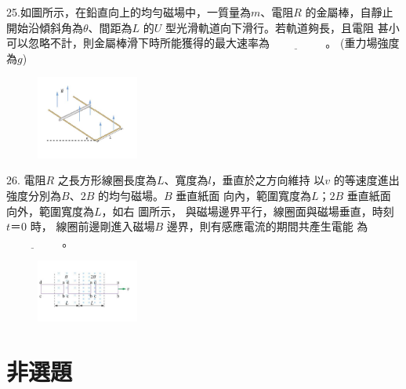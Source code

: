 \documentclass[cn,10pt,math=newtx,chinesefont=founder,device=ig]{elegantbook}
\begin{document}
\begin{example}
   25.如圖所示，在鉛直向上的均勻磁場中，一質量為$m$、電阻$R$ 的金屬棒，自靜止
開始沿傾斜角為$\theta$、間距為$L$ 的$U$ 型光滑軌道向下滑行。若軌道夠長，且電阻
甚小可以忽略不計，則金屬棒滑下時所能獲得的最大速率為$\underline{\hspace{2cm}}$ 。
(重力場強度為$g$)\\
    \rightline{[中壢高中教甄109]}
\end{example}
\begin{solution}
    
\end{solution}
\begin{figure}[htbp]
    \flushright
    \includegraphics[width=0.3\textwidth]{image/109中壢25.png}
  \end{figure}
\newpage

\begin{example}
   26. 電阻$R$ 之長方形線圈長度為$L$、寬度為$l$，垂直於之方向維持
以$v$ 的等速度進出強度分別為$B$、$2B$ 的均勻磁場。$B$ 垂直紙面
向內，範圍寬度為$L$；$2B$ 垂直紙面向外，範圍寬度為$L$，如右
圖所示， 與磁場邊界平行，線圈面與磁場垂直，時刻$t ＝ $0 時，
線圈前邊剛進入磁場$B$ 邊界，則有感應電流的期間共產生電能
為$\underline{\hspace{2cm}}$ 。\\
    \rightline{[中壢高中教甄109]}
\end{example}
\begin{solution}
    
\end{solution}
\begin{figure}[htbp]
    \flushright
    \includegraphics[width=0.3\textwidth]{image/109中壢26.png}
  \end{figure}
\newpage

\section{非選題}
\end{document}
